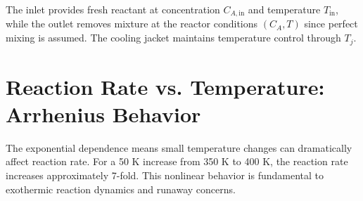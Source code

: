 

The inlet provides fresh reactant at concentration $C_{A,\text{in}}$ and temperature $T_{\text{in}}$, while the outlet removes mixture at the reactor conditions $(C_A, T)$ since perfect mixing is assumed. The cooling jacket maintains temperature control through $T_j$.

\section{Reaction Rate vs. Temperature: Arrhenius Behavior}
\label{sec:reaction_rate_temperature}



The exponential dependence means small temperature changes can dramatically affect reaction rate. For a 50 K increase from 350 K to 400 K, the reaction rate increases approximately 7-fold. This nonlinear behavior is fundamental to exothermic reaction dynamics and runaway concerns.

